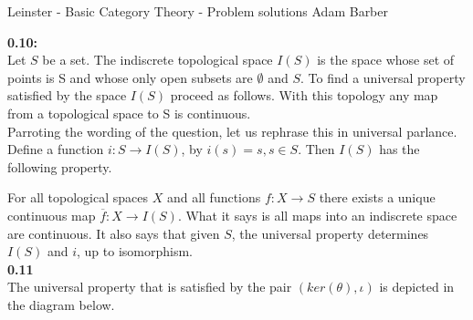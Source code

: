 \documentclass{article}
\begin{document}
Leinster - Basic Category Theory - Problem solutions
Adam Barber


\textbf{0.10:} \\

Let $S$ be a set. The indiscrete topological space $I(S)$ is the space whose set of points is S and whose only open subsets are $\emptyset$ and $S$.
To find a universal property satisfied by the space $I(S)$ proceed as follows.
With this topology any map from a topological space to S is continuous. \\

Parroting the wording of the question, let us rephrase this in
universal parlance. Define a function $i: S \rightarrow I(S)$, by $i(s) = s, s \in S$.
Then $I(S)$ has the following property.


\begin{center}
\end{center}

For all topological spaces $X$ and all functions
$f: X \rightarrow S$ there exists a unique continuous map $\overline{f}: X \rightarrow I(S)$. What it says is all maps into an indiscrete space are continuous. It also says that given $S$, the universal property determines $I(S)$ and $i$, up to isomorphism. \\

\textbf{0.11} \\
The universal property that is satisfied by the pair $(ker(\theta),\iota)$ is depicted in the diagram below.

\begin{center}
\end{center}
\end{document}
